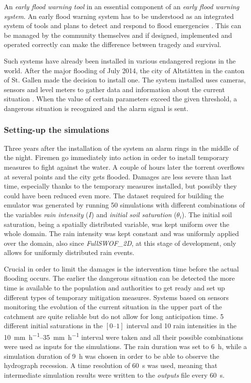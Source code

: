 An \textit{early flood warning tool} in an essential component of an \textit{early flood warning system}.
An early flood warning system has to be understood as an integrated system of tools and plans to detect and respond to flood emergencies \autocite{icimod_early_2018}.
This can be managed by the community themselves and if designed, implemented and operated correctly can make the difference between tragedy and survival.

Such systems have already been installed in various endangered regions in the world.
After the major flooding of July 2014, the city of Altstätten in the canton of St. Gallen made the decision to install one.
The system installed uses cameras, sensors and level meters to gather data and information about the current situation \autocite{st._galler_tageblatt_altstatten_2017}.
When the value of certain parameters exceed the given threshold, a dangerous situation is recognized and the alarm signal is sent.
\subsubsection{Setting-up the simulations}

Three years after the installation of the system an alarm rings in the middle of the night.
Firemen go immediately into action in order to install temporary measures to fight against the water.
A couple of hours later the torrent overflows at several points and the city gets flooded.
Damages are less severe than last time, especially thanks to the temporary measures installed, but possibly they could have been reduced even more.
The dataset required for building the emulator was generated by running \num{50} simulations with different combinations of the variables \emph{rain intensity} ($I$) and \emph{initial soil saturation} ($\theta_i$).
The initial soil saturation, being a spatially distributed variable, was kept uniform over the whole domain.
The rain intensity was kept constant and was uniformly applied over the domain, also since \textit{FullSWOF\_2D}, at this stage of development, only allows for uniformly distributed rain events.

Crucial in order to limit the damages is the intervention time before the actual flooding occurs.
The earlier the dangerous situation can be detected the more time is available to the population and authorities to get ready and set up different types of temporary mitigation measures.
Systems based on sensors monitoring the evolution of the current situation in the upper part of the catchment are quite reliable but do not allow for long anticipation time. 
\num{5} different initial saturations in the $[\numrange{0}{1}]$ interval and \num{10} rain intensities in the \SIrange{10}{35}{\milli\metre\per\hour} interval were taken and all their possible combinations were used as inputs for the simulations.
The rain duration was set to \SI{6}{\hour}, while a simulation duration of \SI{9}{\hour} was chosen in order to be able to observe the hydrograph recession. A time resolution of \SI{60}{\second} was used, meaning that intermediate simulation results were written to the \emph{outputs} file every \SI{60}{\second}.

